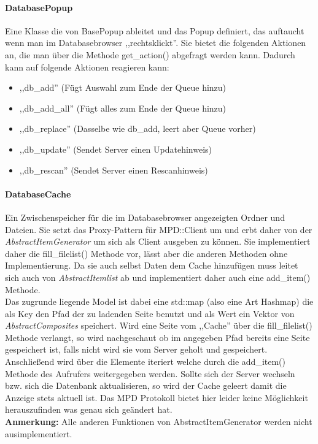 \paragraph{DatabasePopup}
Eine Klasse die von BasePopup ableitet und das Popup definiert, das auftaucht wenn man im Databasebrowser ,,rechtsklickt''.
Sie bietet die folgenden Aktionen an, die man über die Methode get\_action() abgefragt werden kann.
Dadurch kann auf folgende Aktionen reagieren kann:
\begin{itemize}
\item ,,db\_add'' (Fügt Auswahl zum Ende der Queue hinzu)
\item ,,db\_add\_all'' (Fügt alles zum Ende der Queue hinzu)
\item ,,db\_replace'' (Dasselbe wie db\_add, leert aber Queue vorher)
\item ,,db\_update'' (Sendet Server einen Updatehinweis)
\item ,,db\_rescan'' (Sendet Server einen Rescanhinweis)
\end{itemize}

\paragraph{DatabaseCache}
Ein Zwischenspeicher für die im Databasebrowser angezeigten Ordner und Dateien. 
Sie setzt das Proxy-Pattern für MPD::Client um und erbt daher von der \emph{AbstractItemGenerator} um sich als Client ausgeben zu können.
Sie implementiert daher die fill\_filelist() Methode vor, lässt aber die anderen Methoden ohne Implementierung.
Da sie auch selbst Daten dem Cache hinzufügen muss leitet sich auch von \emph{AbstractItemlist} ab und implementiert daher auch eine add\_item() Methode. 
\\
Das zugrunde liegende Model ist dabei eine std::map (also eine Art Hashmap) die als Key den Pfad der zu ladenden Seite benutzt
und als Wert ein Vektor von \emph{AbstractComposites} speichert. Wird eine Seite vom ,,Cache'' über die fill\_filelist() Methode verlangt,
so wird nachgeschaut ob im angegeben Pfad bereits eine Seite gespeichert ist, falls nicht wird sie vom Server geholt und gespeichert. 
Anschließend wird über die Elemente iteriert welche durch die add\_item() Methode des Aufrufers weitergegeben werden. 
Sollte sich der Server wechseln bzw. sich die Datenbank aktualisieren, so wird der Cache geleert damit die Anzeige stets aktuell ist. 
Das MPD Protokoll bietet hier leider keine Möglichkeit herauszufinden was genau sich geändert hat.
\\
\textbf{Anmerkung:} Alle anderen Funktionen von AbstractItemGenerator werden nicht ausimplementiert.


